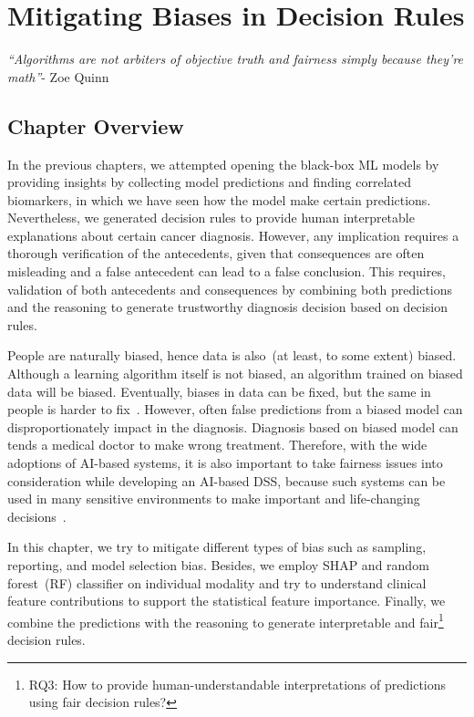 \chapter{Mitigating Biases in Decision Rules} \label{chapter:fairness}
\textit{``Algorithms are not arbiters of objective truth and fairness simply because they're math''}- Zoe Quinn\\

\section{Chapter Overview}
In the previous chapters, we attempted opening the black-box ML models by providing insights by collecting model predictions and finding correlated biomarkers, in which we have seen how the model make certain predictions. Nevertheless, we generated decision rules to provide human interpretable explanations about certain cancer diagnosis. However, any implication requires a thorough verification of the antecedents, given that consequences are often misleading and a false antecedent can lead to a false conclusion. This requires, validation of both antecedents and consequences by combining both predictions and the reasoning to generate trustworthy diagnosis decision based on decision rules. 

\hspace*{3.5mm} People are naturally biased, hence data is also~(at least, to some extent) biased. Although a learning algorithm itself is not biased, an algorithm trained on biased data will be biased. Eventually, biases in data can be fixed, but the same in people is harder to fix~\cite{biasList}. However, often false predictions from a biased model can disproportionately impact in the diagnosis. Diagnosis based on biased model can tends a medical doctor to make wrong treatment. Therefore, with the wide adoptions of AI-based systems, it is also important to take fairness issues into consideration while developing an AI-based DSS, because such systems can be used in many sensitive environments to make important and life-changing decisions~\cite{stiglic2020interpretability}.

\hspace*{3.5mm}In this chapter, we try to mitigate different types of bias such as sampling, reporting, and model selection bias. Besides, we employ SHAP and random forest~(RF) classifier on individual modality and try to understand clinical feature contributions to support the statistical feature importance. Finally, we combine the predictions with the reasoning to generate interpretable and fair\footnote{{RQ3}: How to provide human-understandable interpretations of predictions using fair decision rules?} decision rules. 

